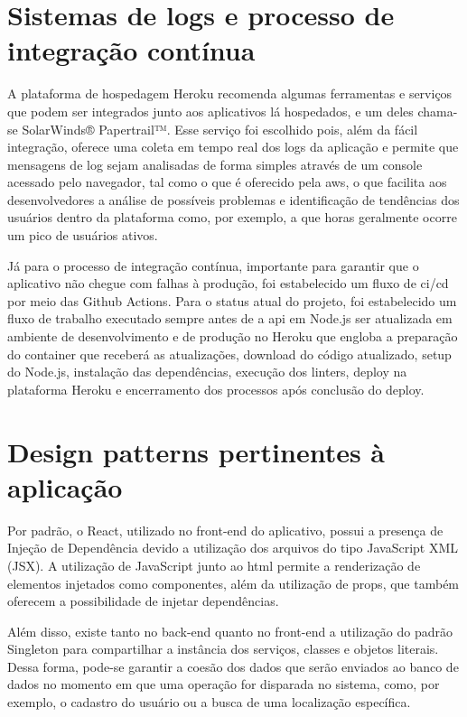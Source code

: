 \section{Sistemas de logs e processo de integração contínua}
A plataforma de hospedagem Heroku recomenda algumas ferramentas e serviços que podem ser integrados junto aos aplicativos lá hospedados, e um deles chama-se SolarWinds® Papertrail™. Esse serviço foi escolhido pois, além da fácil integração, oferece uma coleta em tempo real dos logs da aplicação e permite que mensagens de log sejam analisadas de forma simples através de um console acessado pelo navegador, tal como o que é oferecido pela \ac{aws}, o que facilita aos desenvolvedores a análise de possíveis problemas e identificação de tendências dos usuários dentro da plataforma como, por exemplo, a que horas geralmente ocorre um pico de usuários ativos.

Já para o processo de integração contínua, importante para garantir que o aplicativo não chegue com falhas à produção, foi estabelecido um fluxo de \ac{ci}/\ac{cd} por meio das Github Actions. Para o status atual do projeto, foi estabelecido um fluxo de trabalho executado sempre antes de a \ac{api} em Node.js ser atualizada em ambiente de desenvolvimento e de produção no Heroku que engloba a preparação do container que receberá as atualizações, download do código atualizado, setup do Node.js, instalação das dependências, execução dos linters, deploy na plataforma Heroku e encerramento dos processos após conclusão do deploy.


\section{Design patterns pertinentes à aplicação}
Por padrão, o React, utilizado no front-end do aplicativo, possui a presença de Injeção de 
Dependência devido a utilização dos arquivos do tipo JavaScript XML (JSX). A utilização de JavaScript junto ao \ac{html} permite a renderização de elementos injetados como componentes, além da utilização de props, que também oferecem a possibilidade de injetar dependências. 

Além disso, existe tanto no back-end quanto no front-end a utilização do padrão Singleton para compartilhar a instância dos serviços, classes e objetos literais. Dessa forma, pode-se garantir a coesão dos dados que serão enviados ao banco de dados no momento em que uma operação for disparada no sistema, como, por exemplo, o cadastro do usuário ou a busca de uma localização específica.


